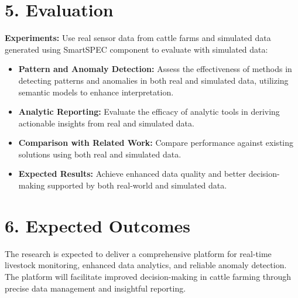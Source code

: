 \documentclass[11pt]{article}
\begin{document}
\section*{5. Evaluation}
\textbf{Experiments:} Use real sensor data from cattle farms and simulated data generated using SmartSPEC component to evaluate with simulated data:
\begin{itemize}
    \item \textbf{Pattern and Anomaly Detection:} Assess the effectiveness of methods in detecting patterns and anomalies in both real and simulated data, utilizing semantic models to enhance interpretation.
    \item \textbf{Analytic Reporting:} Evaluate the efficacy of analytic tools in deriving actionable insights from real and simulated data.
    \item \textbf{Comparison with Related Work:} Compare performance against existing solutions using both real and simulated data.
    \item \textbf{Expected Results:} Achieve enhanced data quality and better decision-making supported by both real-world and simulated data.
\end{itemize}



\section*{6. Expected Outcomes}
The research is expected to deliver a comprehensive platform for real-time livestock monitoring, enhanced data analytics, and reliable anomaly detection. The platform will facilitate improved decision-making in cattle farming through precise data management and insightful reporting.
\end{document}

